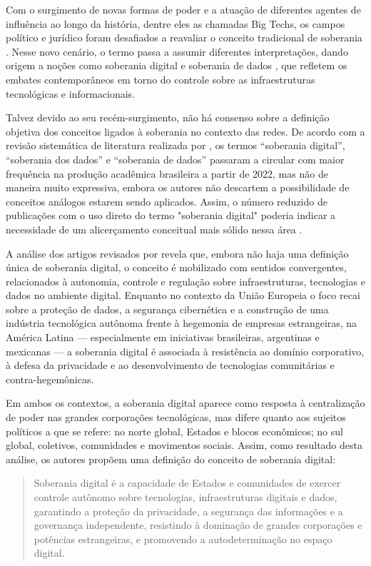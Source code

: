 Com o surgimento de novas formas de poder e a atuação de diferentes agentes de influência ao longo da história, dentre eles as chamadas Big Techs, os campos político e jurídico foram desafiados a reavaliar o conceito tradicional de soberania \cite{lemos2024}. Nesse novo cenário, o termo passa a assumir diferentes interpretações, dando origem a noções como soberania digital e soberania de dados \cite{tecnopolitica2023}, que refletem os embates contemporâneos em torno do controle sobre as infraestruturas tecnológicas e informacionais.

Talvez devido ao seu recém-surgimento, não há consenso sobre a definição objetiva dos conceitos ligados à soberania no contexto das redes. De acordo com a revisão sistemática de literatura realizada por , os termos “soberania digital”, “soberania dos dados” e “soberania de dados” passaram a circular com maior frequência na produção acadêmica brasileira a partir de 2022, mas não de maneira muito expressiva, embora os autores não descartem a possibilidade de conceitos análogos estarem sendo aplicados. Assim, o número reduzido de publicações com o uso direto do termo "soberania digital" poderia indicar a necessidade de um alicerçamento conceitual mais sólido nessa área \cite{lemos2024}.

A análise dos artigos revisados por  revela que, embora não haja uma definição única de soberania digital, o conceito é mobilizado com sentidos convergentes, relacionados à autonomia, controle e regulação sobre infraestruturas, tecnologias e dados no ambiente digital. Enquanto no contexto da União Europeia o foco recai sobre a proteção de dados, a segurança cibernética e a construção de uma indústria tecnológica autônoma frente à hegemonia de empresas estrangeiras, na América Latina — especialmente em iniciativas brasileiras, argentinas e mexicanas — a soberania digital é associada à resistência ao domínio corporativo, à defesa da privacidade e ao desenvolvimento de tecnologias comunitárias e contra-hegemônicas. 

Em ambos os contextos, a soberania digital aparece como resposta à centralização de poder nas grandes corporações tecnológicas, mas difere quanto aos sujeitos políticos a que se refere: no norte global, Estados e blocos econômicos; no sul global, coletivos, comunidades e movimentos sociais. Assim, como resultado desta análise, os autores propõem uma definição do conceito de soberania digital:

\begin{quote}
Soberania digital é a capacidade de Estados e comunidades de exercer controle autônomo sobre tecnologias, infraestruturas digitais e dados, garantindo a proteção da privacidade, a segurança das informações e a governança independente, resistindo à dominação de grandes corporações e potências estrangeiras, e promovendo a autodeterminação no espaço digital. \cite{lemos2024}
\end{quote}

